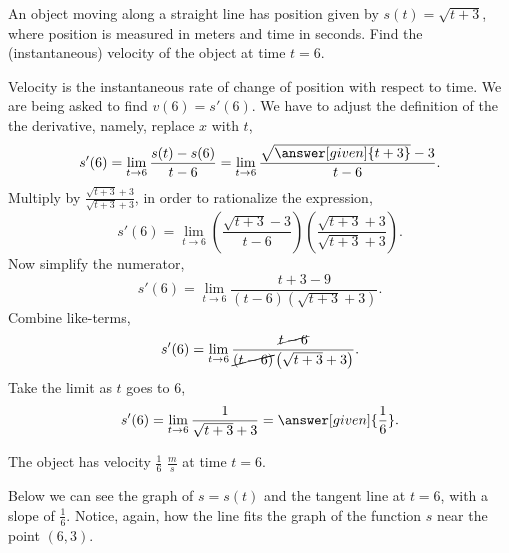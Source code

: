 \documentclass{ximera}
\begin{document}
\begin{example}
\begin{explanation}
\begin{onlineOnly}
\begin{image}
\end{image}

  \end{onlineOnly}
  \end{explanation}
\end{example}
\begin{example}
  An object moving along a straight line has position given by
  $s(t) = \sqrt{t+3}$, where position is measured in meters and time in seconds.  Find the (instantaneous) velocity of the object at time $t=6$.
  \begin{explanation}
    Velocity is the instantaneous rate of change of position with respect to
    time.  We are being asked to find $v(6)=s'(6)$.  We have to adjust the
    definition of the the derivative, namely, replace $x$ with $t$,
    \[
   s'(6) = \lim_{t \to 6} \frac{s(t)-s(6)}{t-6} = \lim_{t\to 6} \frac{\sqrt{\answer[given]{t+3}}-3}{t-6}.
    \]
    Multiply by $\frac{\sqrt{t+3}+3}{\sqrt{t+3}+3}$, in order to rationalize the expression,
    \[
    s'(6) = \lim_{t\to 6} \left(\frac{\sqrt{t+3}-3}{t-6} \right)\left(\frac{\sqrt{t+3}+3}{\sqrt{t+3}+3} \right).
    \]		
    Now simplify the numerator,
    \[
    s'(6) = \lim_{t \to 6} \frac{t+3 - 9}{(t-6)\left(\sqrt{t+3}+3 \right)}.
    \]
    Combine like-terms,
    \[
   s'(6)= \lim_{t \to 6} \frac{\cancel{t-6}}{\cancel{(t-6)}\left(\sqrt{t+3}+3\right)}.
    \]
     Take the limit as $t$ goes to $6$,
    \[
    s'(6)= \lim_{t\to 6} \frac{1}{\sqrt{t+3}+3}=\answer[given]{\frac{1}{6}}.
    \]
  
   
    The object has velocity $\frac{1}{6}$ $\frac{m}{s}$ at time $t=6$.
    
	  \begin{onlineOnly}
	Below we can see the graph of $s=s(t)$ and the tangent line at $t=6$, with a slope of $\frac{1}{6}$. 
	Notice, again, how the line fits the graph of the function $s$ near the point $(6,3)$. 
		 \begin{image}
\end{image}
\end{onlineOnly}
\end{explanation}
\end{example}
\end{document}
